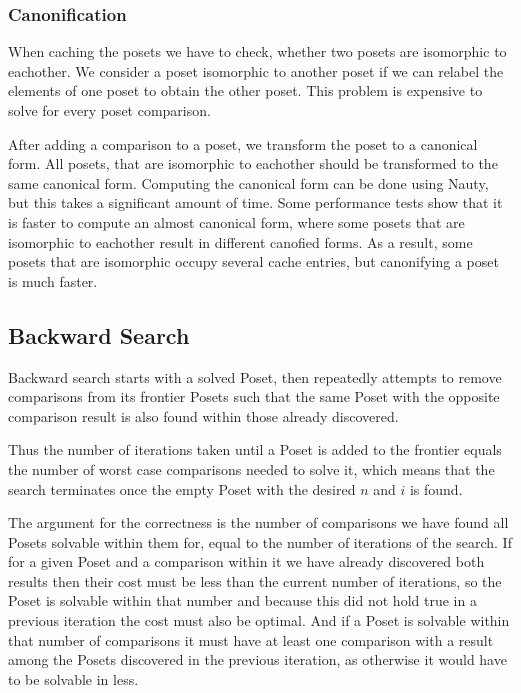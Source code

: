 \documentclass[10pt,journal,compsoc]{IEEEtran}
\begin{document}
\subsubsection{Canonification}

When caching the posets we have to check, whether two posets are isomorphic to eachother.
We consider a poset isomorphic to another poset if we can relabel the elements of one poset to obtain the other poset.
This problem is expensive to solve for every poset comparison.

After adding a comparison to a poset, we transform the poset to a canonical form.
All posets, that are isomorphic to eachother should be transformed to the same canonical form.
Computing the canonical form can be done using Nauty, but this takes a significant amount of time.
Some performance tests show that it is faster to compute an almost canonical form, where some posets that are isomorphic to eachother result in different canofied forms.
As a result, some posets that are isomorphic occupy several cache entries, but canonifying a poset is much faster.

\subsection{Backward Search}

Backward search starts with a solved Poset, then repeatedly attempts to remove comparisons from its
frontier Posets such that the same Poset with the opposite comparison result is also found within
those already discovered.

Thus the number of iterations taken until a Poset is added to the frontier equals the number of
worst case comparisons needed to solve it, which means that the search terminates once the empty
Poset with the desired $n$ and $i$ is found.

The argument for the correctness is the number of comparisons we have found all Posets solvable
within them for, equal to the number of iterations of the search. If for a given Poset and a
comparison within it we have already discovered both results then their cost must be less than the
current number of iterations, so the Poset is solvable within that number and because this did not
hold true in a previous iteration the cost must also be optimal. And if a Poset is solvable within
that number of comparisons it must have at least one comparison with a result among the Posets
discovered in the previous iteration, as otherwise it would have to be solvable in less.
\end{document}
